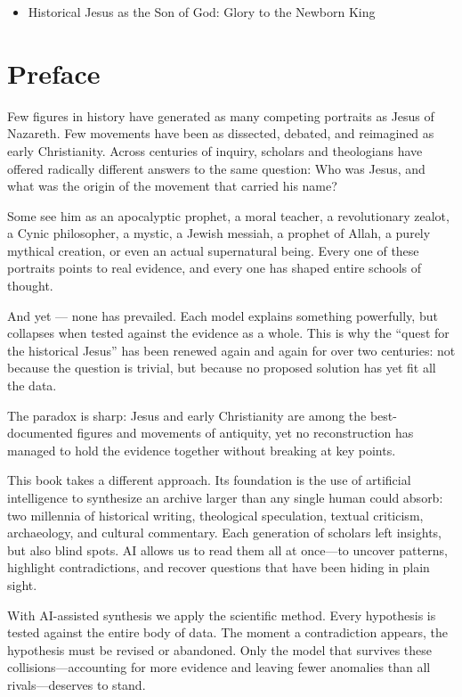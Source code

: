 \begin{itemize}
    \item
    Historical Jesus as the Son of God: Glory to the Newborn King
\end{itemize}

\section{Preface}\label{par:preface}

Few figures in history have generated as many competing portraits as Jesus of Nazareth.
Few movements have been as dissected, debated, and reimagined as early Christianity.
Across centuries of inquiry, scholars and theologians have offered radically different answers to the same question: Who was Jesus, and what was the origin of the movement that carried his name?

Some see him as an apocalyptic prophet, a moral teacher, a revolutionary zealot, a Cynic philosopher, a mystic, a Jewish messiah, a prophet of Allah, a purely mythical creation, or even an actual supernatural being.
Every one of these portraits points to real evidence, and every one has shaped entire schools of thought.

And yet — none has prevailed.
Each model explains something powerfully, but collapses when tested against the evidence as a whole.
This is why the “quest for the historical Jesus” has been renewed again and again for over two centuries: not because the question is trivial, but because no proposed solution has yet fit all the data.

The paradox is sharp: Jesus and early Christianity are among the best-documented figures and movements of antiquity, yet no reconstruction has managed to hold the evidence together without breaking at key points.

This book takes a different approach.
Its foundation is the use of artificial intelligence to synthesize an archive larger than any single human could absorb: two millennia of historical writing, theological speculation, textual criticism, archaeology, and cultural commentary.
Each generation of scholars left insights, but also blind spots.
AI allows us to read them all at once—to uncover patterns, highlight contradictions, and recover questions that have been hiding in plain sight.

With AI-assisted synthesis we apply the scientific method.
Every hypothesis is tested against the entire body of data.
The moment a contradiction appears, the hypothesis must be revised or abandoned.
Only the model that survives these collisions—accounting for more evidence and leaving fewer anomalies than all rivals—deserves to stand.

